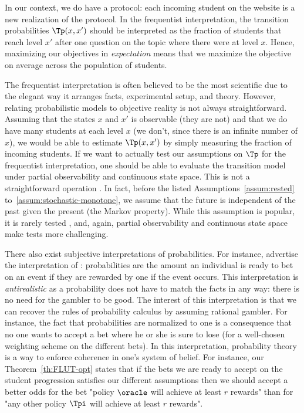 In our context, we do have a protocol: each incoming student on the website is a new realization of the protocol. In the frequentist interpretation, the transition probabilities $\Tp(x,x')$ should be interpreted as the fraction of students that reach level $x'$ after one question on the topic where there were at level $x$. Hence, maximizing our objectives in \emph{expectation} means that we maximize the objective on average across the population of students.

The frequentist interpretation is often believed to be the most scientific due to the elegant way it arranges facts, experimental setup, and theory. However, relating probabilistic models to objective reality is not always straightforward. Assuming that the states $x$ and $x'$ is observable (they are not) and that we do have many students at each level $x$ (we don't, since there is an infinite number of $x$), we would be able to estimate $\Tp(x,x')$ by simply measuring the fraction of incoming students. If we want to actually test our assumptions on $\Tp$ for the frequentist interpretation, one should be able to evaluate the transition model under partial observability and continuous state space. This is not a straightforward operation \citep{shani2005model}. In fact, before the listed Assumptions~\ref{assum:rested} to~\ref{assum:stochastic-monotone}, we assume that the future is independent of the past given the present (the Markov property). While this assumption is popular, it is rarely tested \citep{bickenbach2001markov}, and, again, partial observability and continuous state space make tests more challenging.

There also exist subjective interpretations of probabilities. For instance, \citet{lavenant2019how} advertise the interpretation of \citet{definetti1972probability}: probabilities are the amount an individual is ready to bet on an event if they are rewarded by one if the event occurs. This interpretation is \emph{antirealistic} as a probability does not have to match the facts in any way: there is no need for the gambler to be good. The interest of this interpretation is that we can recover the rules of probability calculus by assuming rational gambler. For instance, the fact that probabilities are normalized to one is a consequence that no one wants to accept a bet where he or she is sure to lose (for a well-chosen weighting scheme on the different bets). In this interpretation, probability theory is a way to enforce coherence in one's system of belief. For instance, our Theorem~\ref{th:FLUT-opt} states that if the bets we are ready to accept on the student progression satisfies our different assumptions then we should accept a better odds for the bet "policy $\oracle$ will achieve at least $r$ rewards" than for "any other policy $\Tpi$ will achieve at least $r$ rewards". 
